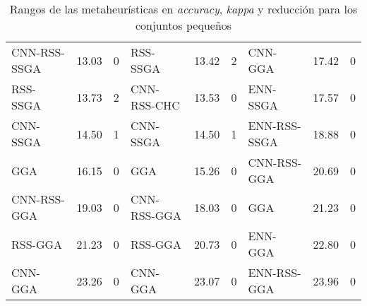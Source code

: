\begin{table}[]
\begin{adjustbox}{max width =\textwidth}
\begin{tabular}{l c c|l c c|l c c}
CNN-RSS-SSGA & 13.03 & 0 & RSS-SSGA     & 13.42 & 2 & CNN-GGA      & 17.42 & 0  \\
RSS-SSGA     & 13.73 & 2 & CNN-RSS-CHC  & 13.53 & 0 & ENN-SSGA     & 17.57 & 0  \\ 
CNN-SSGA     & 14.50 & 1 & CNN-SSGA     & 14.50 & 1 & ENN-RSS-SSGA & 18.88 & 0  \\ 
GGA          & 16.15 & 0 & GGA          & 15.26 & 0 & CNN-RSS-GGA  & 20.69 & 0  \\
CNN-RSS-GGA  & 19.03 & 0 & CNN-RSS-GGA  & 18.03 & 0 & GGA          & 21.23 & 0  \\
RSS-GGA      & 21.23 & 0 & RSS-GGA      & 20.73 & 0 & ENN-GGA      & 22.80 & 0  \\
CNN-GGA      & 23.26 & 0 & CNN-GGA      & 23.07 & 0 & ENN-RSS-GGA  & 23.96 & 0  \\


\hline
\end{tabular}
\end{adjustbox}
\caption{Rangos de las metaheurísticas en \emph{accuracy}, \emph{kappa} y reducción para los conjuntos pequeños}
\label{table-inits-rank}
\end{table} 

